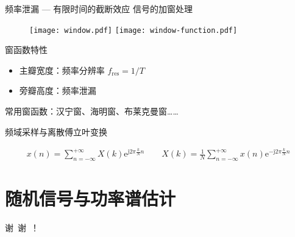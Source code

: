 \documentclass[UTF8]{ctexbeamer}
\begin{document}
\begin{frame}{频率泄漏 --- 有限时间的截断效应}
    信号的加窗处理
    \begin{figure}
        \centering
        \texttt{[image: window.pdf]}
        \hspace{20pt}
        \texttt{[image: window-function.pdf]}
    \end{figure}

    窗函数特性
    \begin{itemize}
        \item 主瓣宽度：频率分辨率 $f_\mathrm{res} = 1/T$ 
        \item 旁瓣高度：频率泄漏
    \end{itemize}

    常用窗函数：汉宁窗、海明窗、布莱克曼窗……
\end{frame}




\begin{frame}{频域采样与离散傅立叶变换}
    \begin{tcolorbox}[top=0mm,
        title = 离散傅立叶变换（Discrete Fourier Transform）,
        boxrule = 0.3pt,
        fontupper = \normalcolor\small]
        \begin{gather*}
            x(n) = \sum_{n=-\infty}^{+\infty} X(k) \mathrm{e}^{\mathrm{j} 2\pi\frac{k}{N} n} 
            \qquad
            X(k) = \frac{1}{N} \sum_{n=-\infty}^{+\infty} x(n) \mathrm{e}^{-\mathrm{j} 2\pi\frac{k}{N} n}            
        \end{gather*}
    \end{tcolorbox}
\end{frame}




\section{随机信号与功率谱估计}


\begin{frame}[standout]
     谢\ 谢\ ！
\end{frame}
\end{document}
